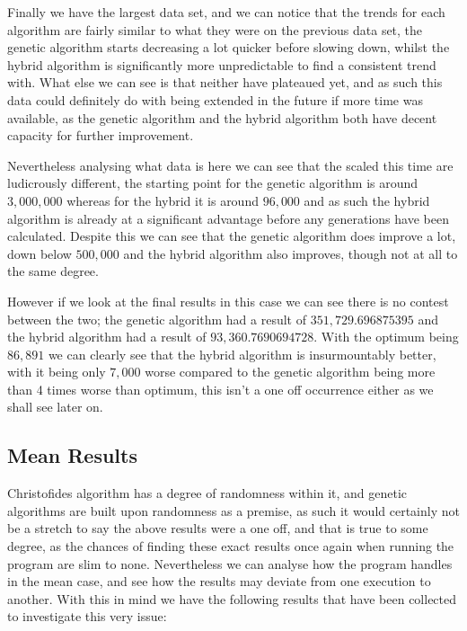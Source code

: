 \documentclass[11pt,a4paper,titlepage]{article}
\begin{document}
Finally we have the largest data set, and we can notice that the trends for each algorithm are fairly similar to what they were on the previous data set, the genetic algorithm starts decreasing a lot quicker before slowing down, whilst the hybrid algorithm is significantly more unpredictable to find a consistent trend with. What else we can see is that neither have plateaued yet, and as such this data could definitely do with being extended in the future if more time was available, as the genetic algorithm and the hybrid algorithm both have decent capacity for further improvement.

Nevertheless analysing what data is here we can see that the scaled this time are ludicrously different, the starting point for the genetic algorithm is around $3,000,000$ whereas for the hybrid it is around $96,000$ and as such the hybrid algorithm is already at a significant advantage before any generations have been calculated. Despite this we can see that the genetic algorithm does improve a lot, down below $500,000$ and the hybrid algorithm also improves, though not at all to the same degree.

However if we look at the final results in this case we can see there is no contest between the two; the genetic algorithm had a result of $351,729.696875395$ and the hybrid algorithm had a result of $93,360.7690694728$. With the optimum being $86,891$ we can clearly see that the hybrid algorithm is insurmountably better, with it being only $7,000$ worse compared to the genetic algorithm being more than 4 times worse than optimum, this isn't a one off occurrence either as we shall see later on.

\subsection{Mean Results}

Christofides algorithm has a degree of randomness within it, and genetic algorithms are built upon randomness as a premise, as such it would certainly not be a stretch to say the above results were a one off, and that is true to some degree, as the chances of finding these exact results once again when running the program are slim to none. Nevertheless we can analyse how the program handles in the mean case, and see how the results may deviate from one execution to another. With this in mind we have the following results that have been collected to investigate this very issue:
\end{document}
